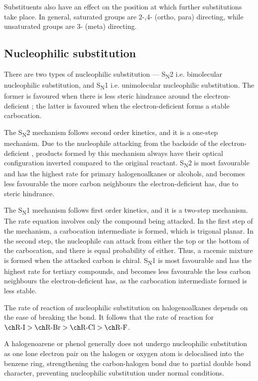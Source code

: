 \documentclass[Chemistry.tex]{subfiles}
\begin{document}
Substituents also have an effect on the position at which further substitutions take place. In general, saturated groups are 2-,4- (ortho, para) directing, while unsaturated groups are 3- (meta) directing.
\subsection{Nucleophilic substitution}
There are two types of nucleophilic substitution --- S\textsubscript{N}2 i.e. bimolecular nucleophilic substitution, and S\textsubscript{N}1 i.e. unimolecular nucleophilic substitution. The former is favoured when there is less steric hindrance around the electron-deficient ; the latter is favoured when the electron-deficient  forms a stable carbocation.

The S\textsubscript{N}2 mechanism follows second order kinetics, and it is a one-step mechanism. Due to the nucleophile attacking from the backside of the electron-deficient , products formed by this mechanism always have their optical configuration inverted compared to the original reactant. S\textsubscript{N}2 is most favourable and has the highest rate for primary halogenoalkanes or alcohols, and becomes less favourable the more carbon neighbours the electron-deficient  has, due to steric hindrance.

The S\textsubscript{N}1 mechanism follows first order kinetics, and it is a two-step mechanism. The rate equation involves only the compound being attacked. In the first step of the mechanism, a carbocation intermediate is formed, which is trigonal planar. In the second step, the nucleophile can attack from either the top or the bottom of the carbocation, and there is equal probability of either. Thus, a racemic mixture is formed when the attacked carbon is chiral. S\textsubscript{N}1 is most favourable and has the highest rate for tertiary compounds, and becomes less favourable the less carbon neighbours the electron-deficient  has, as the carbocation intermediate formed is less stable.

The rate of reaction of nucleophilic substitution on halogenoalkanes depends on the ease of breaking the  bond. It follows that the rate of reaction for \(\slch{R-I} > \slch{R-Br} > \slch{R-Cl} > \slch{R-F}\).

A halogenoarene or phenol generally does not undergo nucleophilic substitution as one lone electron pair on the halogen or oxygen atom is delocalised into the benzene ring, strengthening the carbon-halogen bond due to partial double bond character, preventing nucleophilic substitution under normal conditions.
\end{document}
